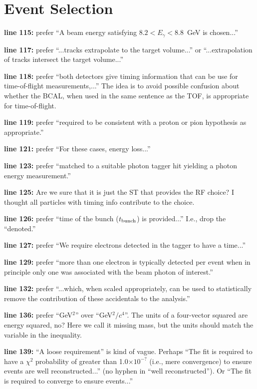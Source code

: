 \documentclass{article}
\newcommand{\itm}[1]{\item{\bf line #1:}}
\begin{document}
\section{Event Selection}

\begin{description}
\itm{115} prefer ``A beam energy satisfying $8.2 < E_\gamma < 8.8$~GeV is chosen...''
\itm{117} prefer ``...tracks extrapolate to the target volume...'' or ``...extrapolation of tracks intersect the target volume...''
\itm{118} prefer ``both detectors give timing information that can be use for time-of-flight measurements,...'' The idea is to avoid possible confusion about whether the BCAL, when used in the same sentence as the TOF, is appropriate for time-of-flight.
\itm{119} prefer ``required to be consistent with a proton or pion hypothesis as appropriate.''
\itm{121} prefer ``For these cases, energy loss...''
\itm{123} prefer ``matched to a suitable photon tagger hit yielding a photon energy measurement.''
\itm{125} Are we sure that it is just the ST that provides the RF choice? I thought all particles with timing info contribute to the choice.
\itm{126} prefer ``time of the bunch ($t_{\rm bunch}$) is provided...'' I.e., drop the ``denoted.''
\itm{127} prefer ``We require electrons detected in the tagger to have a time...''
\itm{129} prefer ``more than one electron is typically detected per event when in principle only one was associated with the beam photon of interest.''
\itm{132} prefer ``...which, when scaled appropriately, can be used to statistically remove the contribution of these accidentals to the analysis.''
\itm{136} prefer ``GeV$^2$'' over ``GeV$^2/c^4$''. The units of a four-vector squared are energy squared, no? Here we call it missing mass, but the units should match the variable in the inequality.
\itm{139} ``A loose requirement'' is kind of vague. Perhaps ``The fit is required to have a $\chi^2$ probability of greater than 1.0$\times 10^{-?}$ (i.e., mere convergence) to ensure events are well reconstructed...'' (no hyphen in ``well reconstructed''). Or ``The fit is required to converge to ensure events...''
\end{description}
\end{document}
